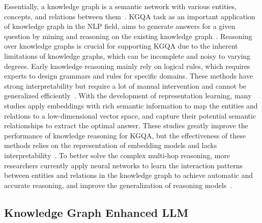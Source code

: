 \documentclass{article}
\begin{document}
Essentially, a knowledge graph is a semantic network with various entities, concepts, and relations between them~\cite{tian2022knowledge}. KGQA task as an important application of knowledge graph in the NLP field, aims to generate answers for a given question by mining and reasoning on the existing knowledge graph~\cite{chakraborty2021introduction}. Reasoning over knowledge graphs is crucial for supporting KGQA due to the inherent limitations of knowledge graphs, which can be incomplete and noisy to varying degrees. Early knowledge reasoning mainly rely on logical rules, which requires experts to design grammars and rules for specific domains. These methods have strong interpretability but require a lot of manual intervention and cannot be generalized efficiently~\cite{berant2013semantic,yih2014semantic,krotzsch2018attributed}. With the development of representation learning, many studies apply embeddings with rich semantic information to map the entities and relations to a low-dimensional vector space, and capture their potential semantic relationships to extract the optimal answer. These studies greatly improve the performance of knowledge  reasoning for KGQA, but the effectiveness of these methods relies on the representation of embedding models and lacks interpretability~\cite{huang2019knowledge,yang2014embedding,liu2017endo}. To better solve the complex multi-hop reasoning, more researchers currently apply neural networks to learn the interaction patterns between entities and relations in the knowledge graph to achieve automatic and accurate reasoning, and improve the generalization of reasoning models~\cite{xiong2019improving,das2017go}.


\subsection{Knowledge Graph Enhanced LLM}
\end{document}
